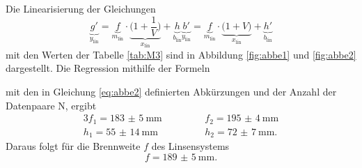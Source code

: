 Die Linearisierung der Gleichungen
\begin{subequations}
\begin{equation}
	\underbrace{g'}_{y_\text{lin}}=\underbrace{f}_{m_\text{lin}}\cdot\underbrace{\biggl(1+\frac{1}{V}\biggr)}_{x_\text{lin}}+\underbrace{h}_{b_\text{lin}}
	\label{eq:abbe1}
	\end{equation}
	\begin{equation}
	\underbrace{b'}_{y_\text{lin}}=\underbrace{f}_{m_\text{lin}}\cdot\underbrace{\bigl(1+V\bigr)}_{x_\text{lin}}+\underbrace{h'}_{b_\text{lin}}
	\label{eq:abbe2}
\end{equation}
\end{subequations}
mit den Werten der Tabelle \ref{tab:M3} sind in Abbildung \ref{fig:abbe1} und \ref{fig:abbe2} dargestellt.
Die Regression mithilfe der Formeln
 
mit den in Gleichung \eqref{eq:abbe2} definierten Abkürzungen und der Anzahl der Datenpaare N, ergibt
\begin{alignat}{3}
	f_1 = \SI{183(5)}{\milli\meter} & \qquad&&f_2 = \SI{195(4)}{\milli\meter} \\
	h_1 = \SI{55(14)}{\milli\meter} & \qquad&&h_2 = \SI{72(7)}{\milli\meter}.
\end{alignat}
Daraus folgt für die Brennweite $f$ des Linsensystems
\begin{equation}
	f = \SI{189(5)}{\milli\meter}.
\end{equation}

